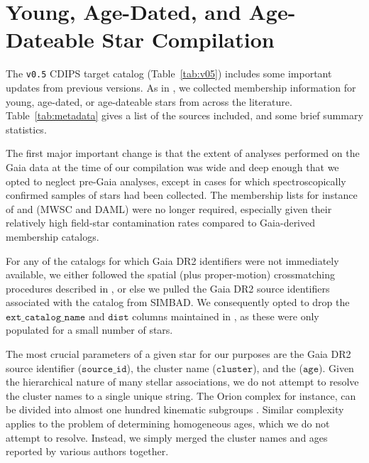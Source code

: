 \documentclass[12pt,modern,tighten]{aastex63}
\begin{document}
% 
% 
% 
% 
% 


\clearpage
                            
 

\appendix
\section{Young, Age-Dated, and Age-Dateable Star Compilation}
\label{app:targetlist}




The \texttt{v0.5} CDIPS target catalog (Table~\ref{tab:v05}) includes
some important updates from previous versions.  As in
\citet{bouma_cdipsI_2019}, we collected membership information for
young, age-dated, or age-dateable stars from across the literature.
Table~\ref{tab:metadata} gives a list of the sources included, and
some brief summary statistics.

The first major important change is that the extent of analyses
performed on the Gaia data at the time of our compilation was wide and
deep enough that we opted to neglect pre-Gaia analyses, except in
cases for which spectroscopically confirmed samples of stars had been
collected.  The membership lists for instance of
\citet{Kharchenko_et_al_2013} and \citet{dias_proper_2014} (MWSC and
DAML) were no longer required, especially given their relatively high
field-star contamination rates compared to Gaia-derived membership
catalogs.

For any of the catalogs for which Gaia DR2 identifiers were not
immediately available, we either followed the spatial (plus
proper-motion) crossmatching procedures described in
\citet{bouma_cdipsI_2019}, or else we pulled the Gaia DR2 source
identifiers associated with the catalog from SIMBAD.  We consequently
opted to drop the $\texttt{ext\_catalog\_name}$ and $\texttt{dist}$
columns maintained in \citet{bouma_cdipsI_2019}, as these were only
populated for a small number of stars.

The most crucial parameters of a given star for our purposes are the
Gaia DR2 source identifier ($\texttt{source\_id}$), the cluster name
($\texttt{cluster}$), and the ($\texttt{age}$).  Given the
hierarchical nature of many stellar associations, we do not attempt to
resolve the cluster names to a single unique string.  The Orion
complex for instance, can be divided into almost one hundred kinematic
subgroups \citep{kounkel_apogee2_2018}.  Similar complexity applies to
the problem of determining homogeneous ages, which we do not attempt
to resolve.  Instead, we simply merged the cluster names and ages
reported by various authors together.
\end{document}
